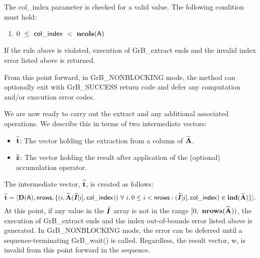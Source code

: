 The {\sf col\_index} parameter is checked for a valid value.  The following
condition must hold:
\begin{enumerate}
	\item $0\ \leq\ {\sf col\_index} \ <\ \bold{ncols}({\sf A})$
\end{enumerate}
If the rule above is violated, execution of {\sf GrB\_extract} ends 
and the invalid index error listed above is returned.

From this point forward, in {\sf GrB\_NONBLOCKING} mode, the method can 
optionally exit with {\sf GrB\_SUCCESS} return code and defer any computation 
and/or execution error codes.

We are now ready to carry out the extract and any additional 
associated operations.  We describe this in terms of two intermediate vectors:
\begin{itemize}
	\item ${\bf \widetilde{t}}$: The vector holding the extraction from
    a column of ${\bf \widetilde{A}}$.
	\item ${\bf \widetilde{z}}$: The vector holding the result after 
    application of the (optional) accumulation operator.
\end{itemize}

The intermediate vector, ${\bf \widetilde{t}}$, is created as follows:
\[ 
{\bf \widetilde{t}} = \langle \bold{D}({\sf A}), {\sf nrows},
\{(i,{\bf \widetilde{A}}(\bm{\widetilde{I}}[i],{\sf col\_index})) 
\ \forall\ i, 0 \leq i < {\sf nrows} : 
(\bm{\widetilde{I}}[i], {\sf col\_index}) \in 
\bold{ind}({\bf \widetilde{A}}) \} \rangle. 
\]
At this point, if any value in the $\bm{\widetilde{I}}$ array is not in
the range $[0,\ \bold{nrows}({\bf \widetilde{A}}) )$, the execution of 
{\sf GrB\_extract} ends and the index out-of-bounds error listed above is 
generated.   In 
{\sf GrB\_NONBLOCKING} mode, the error can be deferred until a 
sequence-terminating {\sf GrB\_wait()} is called.  Regardless, the result 
vector, {\sf w}, is invalid from this point forward in the 
sequence.

